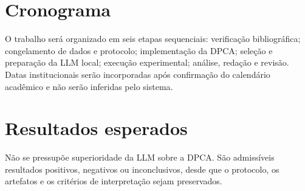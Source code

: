 \documentclass[a4paper,12pt]{abntex2}
\begin{document}
\ResearchHypothesisPT

\section{Cronograma}
O trabalho será organizado em seis etapas sequenciais: verificação bibliográfica; congelamento de dados e protocolo; implementação da DPCA; seleção e preparação da LLM local; execução experimental; análise, redação e revisão. Datas institucionais serão incorporadas após confirmação do calendário acadêmico e não serão inferidas pelo sistema.

\section{Resultados esperados}
\ResearchContributionPT

Não se pressupõe superioridade da LLM sobre a DPCA. São admissíveis resultados positivos, negativos ou inconclusivos, desde que o protocolo, os artefatos e os critérios de interpretação sejam preservados. \ResearchLimitationsPT

\printbibliography[title={Referências}]
\end{document}
